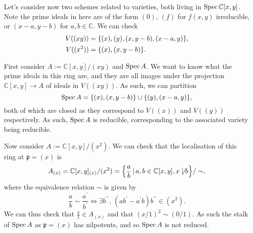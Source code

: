 \documentclass[000-main.tex]{subfiles}
\begin{document}
\begin{example}
	Let's consider now two schemes related to varieties, both living in $\operatorname{Spec} \mathbb{C}[x, y]$. Note the prime ideals in here are of the form $(0)$, $(f)$ for $f(x,y)$ irreducible, or $(x-a, y-b)$ for $a,b \in \mathbb{C}$. We can check 
	\begin{align*}
	V((xy)) &= \qty{(x), (y), (x, y-b), (x-a, y)} , \\
	V((x^2)) &= \qty{(x), (x, y-b)} . 
	\end{align*}
	
	First consider $A := \mathbb{C}[x, y]/(xy)$ and $\operatorname{Spec} A$. We want to know what the prime ideals in this ring are, and they are all images under the projection $\mathbb{C}[x,y] \to A$ of ideals in $V((xy))$. As such, we can partition 
	\[
	\operatorname{Spec} A = \qty{(x), (x, y-b)} \cup \qty{(y), (x-a, y)}, 
	\]
	both of which are closed as they correspond to $V((x))$ and $V((y))$ respectively. As such, $\operatorname{Spec} A$ is reducible, corresponding to the associated variety being reducible. 
	
	Now consider $A := \mathbb{C}[x,y]/(x^2)$. We can check that the localisation of this ring at $\mathfrak{p} = (x)$ is 
	\[
	A_{(x)} = \mathbb{C}[x,y]_{(x)}/(x^2) = \qty{\frac{a}{b} \, | \, a,b \in \mathbb{C}[x,y], x \not\mid b} / \sim,
	\]
	where the equivalence relation $\sim$ is given by 
	\[
	\frac{a}{b} \sim \frac{a^\prime}{b^\prime} \Leftrightarrow \exists b^{\prime \prime}, \, (ab^\prime - a^\prime b)b^{\prime \prime} \in (x^2). 
	\]
	We  can thus check that $\frac{x}{1} \in A_{(x)}$ and that $(x/1)^2 \sim (0/1)$. As such the stalk of $\operatorname{Spec} A$ as $\mathfrak{p} = (x)$ has nilpotents, and so $\operatorname{Spec} A$ is not reduced. 
\end{example}
\end{document}
